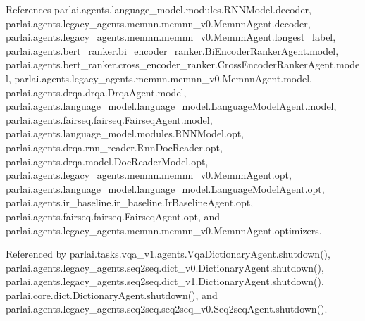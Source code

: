 References parlai.\+agents.\+language\+\_\+model.\+modules.\+R\+N\+N\+Model.\+decoder, parlai.\+agents.\+legacy\+\_\+agents.\+memnn.\+memnn\+\_\+v0.\+Memnn\+Agent.\+decoder, parlai.\+agents.\+legacy\+\_\+agents.\+memnn.\+memnn\+\_\+v0.\+Memnn\+Agent.\+longest\+\_\+label, parlai.\+agents.\+bert\+\_\+ranker.\+bi\+\_\+encoder\+\_\+ranker.\+Bi\+Encoder\+Ranker\+Agent.\+model, parlai.\+agents.\+bert\+\_\+ranker.\+cross\+\_\+encoder\+\_\+ranker.\+Cross\+Encoder\+Ranker\+Agent.\+model, parlai.\+agents.\+legacy\+\_\+agents.\+memnn.\+memnn\+\_\+v0.\+Memnn\+Agent.\+model, parlai.\+agents.\+drqa.\+drqa.\+Drqa\+Agent.\+model, parlai.\+agents.\+language\+\_\+model.\+language\+\_\+model.\+Language\+Model\+Agent.\+model, parlai.\+agents.\+fairseq.\+fairseq.\+Fairseq\+Agent.\+model, parlai.\+agents.\+language\+\_\+model.\+modules.\+R\+N\+N\+Model.\+opt, parlai.\+agents.\+drqa.\+rnn\+\_\+reader.\+Rnn\+Doc\+Reader.\+opt, parlai.\+agents.\+drqa.\+model.\+Doc\+Reader\+Model.\+opt, parlai.\+agents.\+legacy\+\_\+agents.\+memnn.\+memnn\+\_\+v0.\+Memnn\+Agent.\+opt, parlai.\+agents.\+language\+\_\+model.\+language\+\_\+model.\+Language\+Model\+Agent.\+opt, parlai.\+agents.\+ir\+\_\+baseline.\+ir\+\_\+baseline.\+Ir\+Baseline\+Agent.\+opt, parlai.\+agents.\+fairseq.\+fairseq.\+Fairseq\+Agent.\+opt, and parlai.\+agents.\+legacy\+\_\+agents.\+memnn.\+memnn\+\_\+v0.\+Memnn\+Agent.\+optimizers.



Referenced by parlai.\+tasks.\+vqa\+\_\+v1.\+agents.\+Vqa\+Dictionary\+Agent.\+shutdown(), parlai.\+agents.\+legacy\+\_\+agents.\+seq2seq.\+dict\+\_\+v0.\+Dictionary\+Agent.\+shutdown(), parlai.\+agents.\+legacy\+\_\+agents.\+seq2seq.\+dict\+\_\+v1.\+Dictionary\+Agent.\+shutdown(), parlai.\+core.\+dict.\+Dictionary\+Agent.\+shutdown(), and parlai.\+agents.\+legacy\+\_\+agents.\+seq2seq.\+seq2seq\+\_\+v0.\+Seq2seq\+Agent.\+shutdown().

